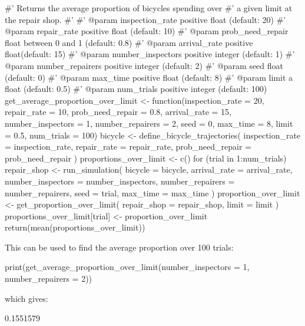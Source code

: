 \begin{Rin}
#' Returns the average proportion of bicycles spending over
#' a given limit at the repair shop.
#'
#' @param inspection_rate positive float (default: 20)
#' @param repair_rate positive float (default: 10)
#' @param prob_need_repair float between 0 and 1 (default: 0.8)
#' @param arrival_rate positive float(default: 15)
#' @param number_inspectors positive integer (default: 1)
#' @param number_repairers positive integer (default: 2)
#' @param seed float (default: 0)
#' @param max_time positive float (default: 8)
#' @param limit a float (default: 0.5)
#' @param num_trials positive integer (default: 100)
get_average_proportion_over_limit <- function(inspection_rate = 20,
                                              repair_rate = 10,
                                              prob_need_repair = 0.8,
                                              arrival_rate = 15,
                                              number_inspectors = 1,
                                              number_repairers = 2,
                                              seed = 0,
                                              max_time = 8,
                                              limit = 0.5,
                                              num_trials = 100) {
  bicycle <- define_bicycle_trajectories(
    inspection_rate = inspection_rate,
    repair_rate = repair_rate,
    prob_need_repair = prob_need_repair
  )
  proportions_over_limit <- c()
  for (trial in 1:num_trials) {
    repair_shop <- run_simulation(
      bicycle = bicycle,
      arrival_rate = arrival_rate,
      number_inspectors = number_inspectors,
      number_repairers = number_repairers,
      seed = trial,
      max_time = max_time
    )
    proportion_over_limit <- get_proportion_over_limit(
      repair_shop = repair_shop,
      limit = limit
    )
    proportions_over_limit[trial] <- proportion_over_limit
  }
  return(mean(proportions_over_limit))
}
\end{Rin}

This can be used to find the average proportion over 100 trials:

\begin{Rin}
print(get_average_proportion_over_limit(number_inspectors = 1, number_repairers = 2))
\end{Rin}

which gives:

\begin{Rout}
[1] 0.1551579
\end{Rout}

